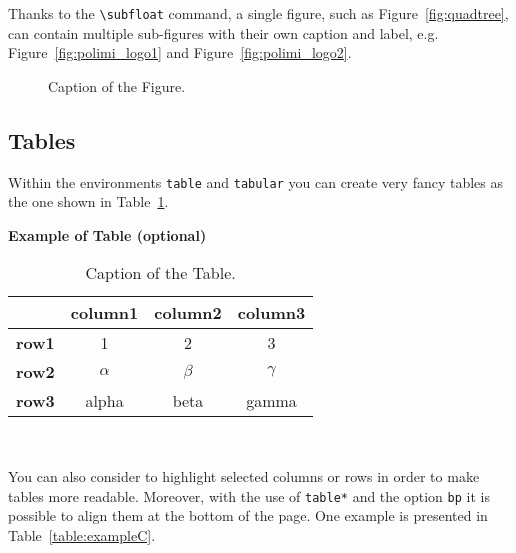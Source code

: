 \documentclass[11pt,a4paper]{article}
\begin{document}
        Thanks to the \texttt{\textbackslash subfloat} command, a single figure, such as Figure~\ref{fig:quadtree}, can contain multiple sub-figures with their own caption and label, e.g. Figure~\ref{fig:polimi_logo1} and Figure~\ref{fig:polimi_logo2}. 

        \begin{figure}[H]
            \centering
            \quad
            \caption[]{Caption of the Figure.}
            \label{fig:quadtree2}
        \end{figure}

    \subsection{Tables} \label{subsec:tables}

        Within the environments \texttt{table} and  \texttt{tabular} you can create very fancy tables as the one shown in Table~\ref{table:example}.

        \begin{table}[H]
            \caption*{\textbf{Example of Table (optional)}}
            \centering 
            \begin{tabular}{|p{3em} c c c |}
            \hline
            \rowcolor{bluePoli!40}
            & \textbf{column1} & \textbf{column2} & \textbf{column3} \T\B \\
            \hline \hline
            \textbf{row1} & 1 & 2 & 3 \T\B \\
            \textbf{row2} & $\alpha$ & $\beta$ & $\gamma$ \T\B\\
            \textbf{row3} & alpha & beta & gamma \B\\
            \hline
            \end{tabular}
            \\[10pt]
            \caption{Caption of the Table.}
            \label{table:example}
        \end{table}

        You can also consider to highlight selected columns or rows in order to make tables more readable. Moreover, with the use of \texttt{table*} and the option \texttt{bp} it is possible to align them at the bottom of the page. One example is presented in Table~\ref{table:exampleC}. 
\end{document}
